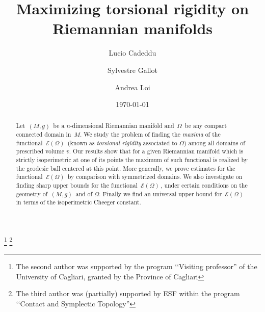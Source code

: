 \documentclass[11pt, reqno]{amsart}
\theoremstyle{plain}
\begin{document}
\title[Maximizing torsional rigidity on Riemannian manifolds] {Maximizing torsional rigidity on Riemannian manifolds}

\author{Lucio Cadeddu}

\address{Dipartimento di Matematica \\
         Universit\`a di Cagliari}
         
 \author{Sylvestre Gallot}
\address{Universit\'e Joseph Fourier Grenoble \\
          Institut Fourier}

\author{Andrea Loi}
\address{Dipartimento di Matematica \\
         Universit\`a di Cagliari}

\thanks{
The second author was supported by the program  \lq\lq Visiting professor'' of the University of Cagliari, granted by the Province of Cagliari}
\thanks{
The third author was (partially) supported by ESF within the program \lq\lq Contact and Symplectic Topology''}

\date{\today}

\begin{abstract}
Let $\,(M,g)\,$ be a $n$-dimensional Riemannian manifold and $\,\Omega\,$ be any compact 
connected domain in $\,M$. We study the problem of finding the {\em maxima} of the functional
$\, {\mathcal E} (\Omega)\,$ (known as  {\em torsional rigidity} associated to $\Omega$)  among all domains of prescribed volume $v$. Our results show that for a given Riemannian manifold which is strictly isoperimetric at one of its points the maximum of such functional is realized by the geodesic ball centered at this point.
More generally, we prove estimates for the functional $\, {\mathcal E} (\Omega)\,$ by comparison with symmetrized domains. We also investigate on finding sharp upper bounds for the functional $\, {\mathcal E} (\Omega)\,$, under certain conditions on the geometry of $\,(M,g)\,$ and of $\Omega$. Finally we find an universal upper bound for $\, {\mathcal E} (\Omega)\,$ in terms of the isoperimetric Cheeger constant.
\end{abstract}

\maketitle
\end{document}
